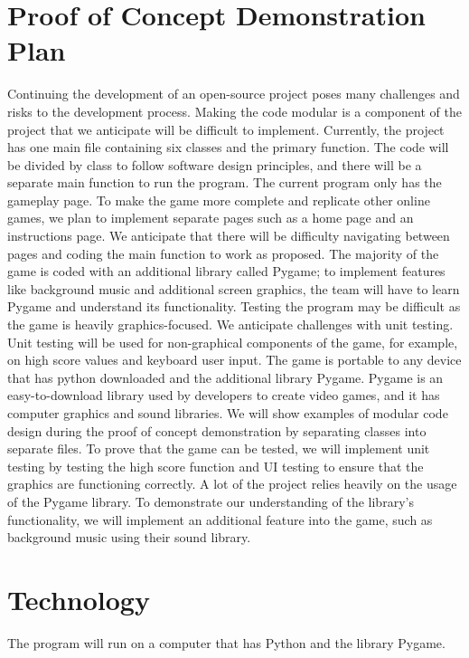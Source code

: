 \documentclass{article}
\begin{document}
	
	\section{Proof of Concept Demonstration Plan}

	Continuing the development of an open-source project poses many challenges and risks to the development process. Making the code modular is a component of the project that we anticipate will be difficult to implement. 
	Currently, the project has one main file containing six classes and the primary function. The code will be divided by class to follow software design principles, and there will be a separate main function to run the program.
	 The current program only has the gameplay page. To make the game more complete and replicate other online games, we plan to implement separate pages such as a home page and an instructions page. We anticipate that there will be difficulty navigating between pages and coding the main function to work as proposed. 
	 The majority of the game is coded with an additional library called Pygame; to implement features like background music and additional screen graphics, the team will have to learn Pygame and understand its functionality. 
	Testing the program may be difficult as the game is heavily graphics-focused. We anticipate challenges with unit testing. Unit testing will be used for non-graphical components of the game, for example, on high score values and keyboard user input.
	 The game is portable to any device that has python downloaded and the additional library Pygame. Pygame is an easy-to-download library used by developers to create video games, and it has computer graphics and sound libraries. 
We will show examples of modular code design during the proof of concept demonstration by separating classes into separate files. To prove that the game can be tested, we will implement unit testing by testing the high score function and UI testing to ensure that the graphics are functioning correctly. A lot of the project relies heavily on the usage of the Pygame library. 
To demonstrate our understanding of the library's functionality, we will implement an additional feature into the game, such as background music using their sound library. 

	
	\section{Technology}
	The program will run on a computer that has Python and the library Pygame. 
	
\end{document}
